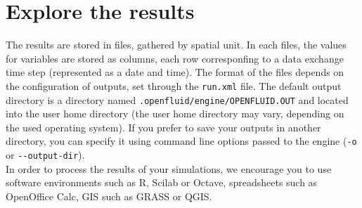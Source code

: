 \section{Explore the results}

The results are stored in files, gathered by spatial unit. In each files, the values for variables are stored as columns, each row corresponfing to a data exchange time step (represented as a date and time).
The format of the files depends on the configuration of outputs, set through the \texttt{run.xml} file.
The default output directory is a directory named \texttt{.openfluid/engine/OPENFLUID.OUT} and located into the user home directory (the user home directory may vary, depending on the used operating system).
If you prefer to save your outputs in another directory, you can specify it using command line options passed to the engine (\texttt{-o} or \verb?--?\texttt{output-dir}).\\

\noindent In order to process the results of your simulations, we encourage you to use software environments such as R, Scilab or Octave, spreadsheets such as OpenOffice Calc, GIS such as GRASS or QGIS.   
